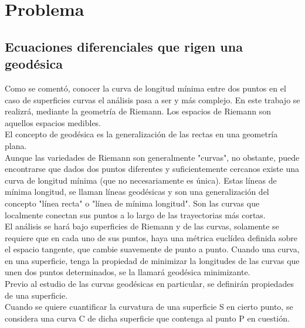 \documentclass{endm}
\begin{document}
\clearpage
%
\section{Problema}\label{Problema}

\subsection{Ecuaciones diferenciales que rigen una geod\'esica}


Como se coment\'o, conocer la curva de longitud m\'inima entre dos puntos en el caso de superficies curvas el an\'alisis pasa a ser y m\'as complejo. En este trabajo se realizr\'a, mediante la geometr\'ia de Riemann. Los espacios de Riemann son aquellos espacios medibles.\\

El concepto de geod\'esica es la generalizaci\'on de las rectas en una geometr\'ia plana.\\

Aunque las variedades de Riemann son generalmente "curvas", no obstante, puede encontrarse que dados dos puntos diferentes y suficientemente cercanos existe una curva de longitud m\'inima (que no necesariamente es \'unica). Estas l\'ineas de m\'inima longitud, se llaman l\'ineas geod\'esicas y son una generalizaci\'on del concepto "l\'inea recta" o "l\'inea de m\'inima longitud". Son las curvas que localmente conectan sus puntos a lo largo de las trayectorias m\'as cortas.\\

El an\'alisis se har\'a bajo superficies de Riemann y de las curvas, solamente se requiere que en cada uno de sus puntos, haya una m\'etrica eucl\'idea definida sobre el espacio tangente, que cambie suavemente de punto a punto. Cuando una curva, en una superficie, tenga la propiedad de minimizar la longitudes de las curvas que unen dos puntos determinados, se la llamar\'a geod\'esica minimizante.\\

Previo al estudio de las curvas geod\'esicas en particular, se definir\'an propiedades de una superficie.\\

Cuando se quiere cuantificar la curvatura de una superficie S en cierto punto, se considera una curva C de dicha superficie que contenga al punto P en cuesti\'on.\\
\end{document}
